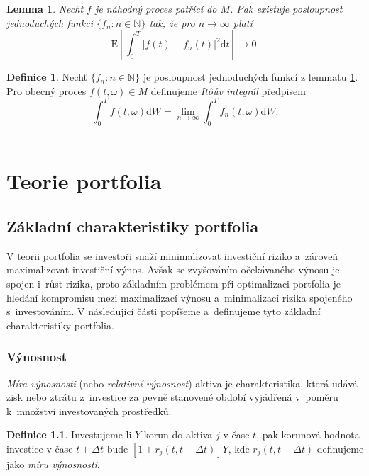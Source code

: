 \documentclass[a4paper,12pt]{report}
\newtheorem{lemma}[veta]{Lemma}
\theoremstyle{definition} \newtheorem{definice}[veta]{Definice}
\theoremstyle{remark}
\begin{document}
\begin{lemma} \label{itoint}
Nechť $f$ je náhodný proces patřící do $M$.
Pak existuje posloupnost jednoduchých funkcí $\{f_n:n\in\mathbb N\}$ tak, že pro $n\to\infty$ platí
$$\mathrm{E}\left[\int_0^T\big[f(t)-f_n(t)\big]^2\mathrm{d}t\right]\longrightarrow0.$$
\end{lemma}

\indent

\begin{definice}
Nechť $\{f_n:n\in\mathbb N\}$ je posloupnost jednoduchých funkcí z lemmatu \ref{itoint}.
Pro obecný proces $f(t,\omega)\in M$ definujeme \textit{It\^oův integrál} předpisem
$$\int_0^Tf(t,\omega)\mathrm{d}W=\lim_{n\to\infty}\int_0^Tf_n(t,\omega)\mathrm{d}W.$$
\\
\end{definice}

\chapter{Teorie portfolia}


\section{Základní charakteristiky portfolia}
V teorii portfolia se investoři snaží minimalizovat investiční riziko a~zároveň maximalizovat investiční výnos. 
Avšak se zvyšováním očekávaného výnosu je spojen i~růst rizika, proto základním problémem při optimalizaci portfolia je hledání kompromisu mezi maximalizací výnosu a~minimalizací rizika spojeného s~investováním.  
V následující části popíšeme a~definujeme tyto základní charakteristiky portfolia.

\subsection{Výnosnost}
\textit{Míra výnosnosti} (nebo \textit{relativní výnosnost}) aktiva je charakteristika, která udává zisk nebo ztrátu z~investice za pevně stanovené období vyjádřená v~poměru k~množství investovaných prostředků.

\begin{definice}
Investujeme-li $Y$ korun do aktiva $j$ v čase $t$, pak korunová hodnota investice v čase $t+\Delta t$ bude $[1+r_j(t,t+\Delta t)]Y$, kde  $r_j(t,t+\Delta t)$ definujeme jako \textit{míru výnosnosti}.  
\end{definice}
 
\end{document}
